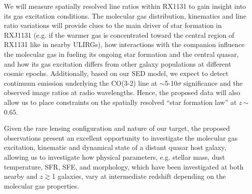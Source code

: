 \documentclass[11pt,a4paper,twoside,graphicx,color]{article}
\newcommand{\bco}{\mbox{CO(2-1)}\xspace}
\newcommand{\cco}{\mbox{CO(3-2)}\xspace}
\newcommand{\ssim}{\,$\sim$\,}
\newcommand{\SF}{star formation\xspace}
\newcommand{\galpop}{galaxy populations\xspace}
\newcommand{\atinterz}{at intermediate redshift\xspace}
\begin{document}
%
We will measure spatially resolved line ratios %
within RX1131 to gain insight into its gas excitation conditions.
The molecular gas distribution, kinematics and line ratio variations will provide clues to
the main driver of \SF in RXJ1131 (e.g. if the warmer gas is
concentrated toward the central region of RX1131 like in nearby ULIRGs),
how interactions with the companion influence the molecular gas
in fueling its ongoing \SF and the central quasar,
and how its gas excitation differs from other \galpop at different cosmic epochs.
%
%
Additionally, based on our SED model, 
we expect to detect continuum emission underlying the \cco line at $\sim$5-10$\sigma$ significance
and the observed image ratios at radio wavelengths.
Hence, the proposed data will also allow us to place constraints on the spatially resolved
``\SF law'' at $z$\ssim0.65.

Given the rare lensing configuration and nature of our target, the proposed observations
present an excellent opportunity to investigate the molecular gas excitation, kinematic and dynamical
state of a distant quasar host galaxy, allowing
us to investigate how physical parameters, e.g. stellar mass, dust temperature, SFR, SFE, and morphology, which have been investigated at both nearby and $z$$\gtrsim$1 galaxies, vary \atinterz depending on the molecular gas
properties. %

\end{document}
